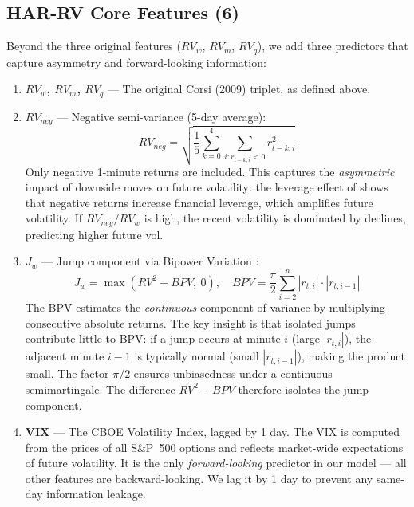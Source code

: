 \documentclass[11pt,a4paper]{article}
\begin{document}
\subsection{HAR-RV Core Features (6)}

Beyond the three original features ($RV_w$, $RV_m$, $RV_q$), we add three predictors that capture asymmetry and forward-looking information:

\begin{enumerate}
    \item \textbf{$RV_w$, $RV_m$, $RV_q$} --- The original Corsi (2009) triplet, as defined above.

    \item \textbf{$RV_{neg}$} --- Negative semi-variance (5-day average):
    \begin{equation}
        RV_{neg} = \sqrt{\frac{1}{5}\sum_{k=0}^{4}\sum_{i: r_{t-k,i}<0} r_{t-k,i}^2}
    \end{equation}
    Only negative 1-minute returns are included. This captures the \textit{asymmetric} impact of downside moves on future volatility: the leverage effect of \citet{black1976} shows that negative returns increase financial leverage, which amplifies future volatility. If $RV_{neg} / RV_w$ is high, the recent volatility is dominated by declines, predicting higher future vol.

    \item \textbf{$J_w$} --- Jump component via Bipower Variation \citep{barndorff2004}:
    \begin{equation}
        J_w = \max\left(RV^2 - BPV, \ 0\right), \quad BPV = \frac{\pi}{2}\sum_{i=2}^{n}|r_{t,i}| \cdot |r_{t,i-1}|
    \end{equation}
    The BPV estimates the \textit{continuous} component of variance by multiplying consecutive absolute returns. The key insight is that isolated jumps contribute little to BPV: if a jump occurs at minute $i$ (large $|r_{t,i}|$), the adjacent minute $i-1$ is typically normal (small $|r_{t,i-1}|$), making the product small. The factor $\pi/2$ ensures unbiasedness under a continuous semimartingale. The difference $RV^2 - BPV$ therefore isolates the jump component.

    \item \textbf{VIX} --- The CBOE Volatility Index, lagged by 1 day. The VIX is computed from the prices of all S\&P~500 options and reflects market-wide expectations of future volatility. It is the only \textit{forward-looking} predictor in our model --- all other features are backward-looking. We lag it by 1 day to prevent any same-day information leakage.
\end{enumerate}
\end{document}
